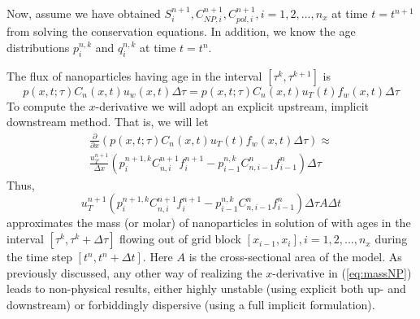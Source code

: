 \documentclass[journal = enfuem, manuscript =  article]{achemso}
\begin{document}
Now, assume we have obtained $S^{n+1}_{i}, C^{n+1}_{\textit{NP}, i}, C^{n+1}_{pol, i}, i=1,2,...,n_x$ at time $t=t^{n+1}$ from solving the conservation equations. In addition, we know the age distributions $p^{n,k}_i$ and $q^{n,k}_i$ at time $t=t^{n}$.

The flux of nanoparticles having age in the interval $\left[\tau^k, \tau^{k+1}\right]$ is
\begin{equation}
    p(x,t;\tau)C_n(x,t)u_w(x,t)\Delta\tau = p(x,t;\tau)C_n(x,t)u_T(t)f_w(x,t)\Delta\tau
\end{equation}
To compute the  $x$-derivative we will adopt an explicit upstream, implicit downstream method. That is, we will let
\begin{multline}
    \frac{\partial}{\partial x} \left(p(x,t;\tau)C_n(x,t)u_T(t)f_w(x,t)\Delta\tau\right) \approx \\ \frac{u_T^{n+1}}{\Delta x} \left(p_i^{n+1,k}C_{n,i}^{n+1}f_i^{n+1}- p_{i-1}^{n,k}C_{n,i-1}^{n}f_{i-1}^{n}\right)\Delta\tau
\end{multline}
Thus,
\begin{equation} \label{eq:massNP} %
    u_T^{n+1} \left(p_i^{n+1,k}C_{n,i}^{n+1}f_i^{n+1}- p_{i-1}^{n,k}C_{n,i-1}^{n}f_{i-1}^{n}\right)\Delta\tau A\Delta t
\end{equation}
approximates the mass (or molar) of nanoparticles in solution of with ages in the interval $\left[\tau^k, \tau^k+\Delta\tau\right]$  flowing out of grid block $\left[x_{i-1},x_i\right],i=1,2,...,n_x$ during the time step  $\left[t^n, t^n+\Delta t\right]$. Here $A$ is the cross-sectional area of the model. As previously discussed, any other way of realizing the  $x$-derivative in (\ref{eq:massNP}) leads to non-physical results, either highly unstable (using explicit both up- and downstream) or forbiddingly dispersive (using a full implicit formulation). 
\end{document}
